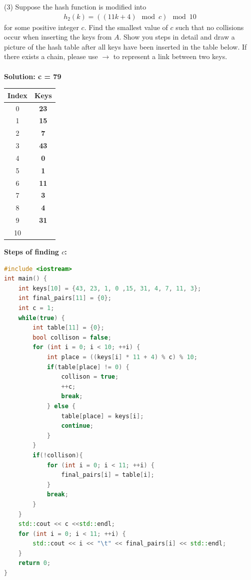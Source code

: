 \documentclass{article}
\begin{document}
\newpage
(3) Suppose the hash function is modified into
\begin{align*}
h_2(k)=((11k+4)\mod c)\mod10
\end{align*}
for some positive integer $c$. Find the smallest value of $c$ such that no collisions occur when inserting the keys from $A$. Show you steps in detail and draw a picture of the hash table after all keys have been inserted in the table below. If there exists a chain, please use $\rightarrow$ to represent a link between two keys.\\
\\\textbf{Solution: c = 79}
\begin{table}[htp]
	\begin{tabular}{|c|c|}
		\hline
		\textbf{Index} & \textbf{Keys} \\ \hline
		0     &\textbf{23}\\ \hline
		1     &\textbf{15}\\ \hline
		2     &\textbf{7}\\ \hline
		3     &\textbf{43}\\ \hline
		4     &\textbf{0}\\ \hline
		5     &\textbf{1}\\ \hline
		6     &\textbf{11}\\ \hline
		7     &\textbf{3}\\ \hline
		8     &\textbf{4}\\ \hline
		9     &\textbf{31}\\ \hline
		10    &\\ \hline
	\end{tabular}
\end{table}
\newpage
\textbf{Steps of finding $c$:}
\begin{lstlisting}[language=c++]
#include <iostream>
int main() {
    int keys[10] = {43, 23, 1, 0 ,15, 31, 4, 7, 11, 3};
    int final_pairs[11] = {0};
    int c = 1;
    while(true) {
        int table[11] = {0};
        bool collison = false;
        for (int i = 0; i < 10; ++i) {
            int place = ((keys[i] * 11 + 4) % c) % 10;
            if(table[place] != 0) {
                collison = true;
                ++c;
                break;
            } else {
                table[place] = keys[i];
                continue;
            }
        }
        if(!collison){
            for (int i = 0; i < 11; ++i) {
                final_pairs[i] = table[i];
            }
            break;
        }
    }
    std::cout << c <<std::endl;
    for (int i = 0; i < 11; ++i) {
        std::cout << i << "\t" << final_pairs[i] << std::endl;
    }
    return 0;
}
\end{lstlisting}	
\newpage
\end{document}
